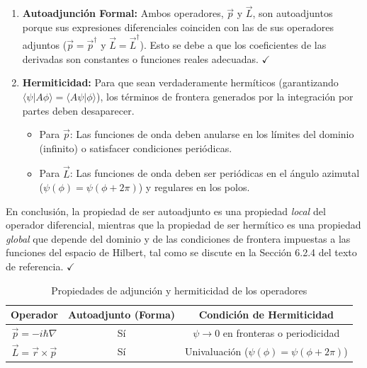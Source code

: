 \documentclass[a4paper]{article}
\begin{document}
\begin{enumerate}
    \item \textbf{Autoadjunción Formal:} Ambos operadores, $\vec{p}$ y $\vec{L}$, son autoadjuntos porque sus expresiones diferenciales coinciden con las de sus operadores adjuntos ($\vec{p} = \vec{p}^\dagger$ y $\vec{L} = \vec{L}^\dagger$). Esto se debe a que los coeficientes de las derivadas son constantes o funciones reales adecuadas. $\checkmark$
    
    \item \textbf{Hermiticidad:} Para que sean verdaderamente hermíticos (garantizando $\langle \psi | A \phi \rangle = \langle A \psi | \phi \rangle$), los términos de frontera generados por la integración por partes deben desaparecer.
    \begin{itemize}
        \item Para $\vec{p}$: Las funciones de onda deben anularse en los límites del dominio (infinito) o satisfacer condiciones periódicas.
        \item Para $\vec{L}$: Las funciones de onda deben ser periódicas en el ángulo azimutal ($\psi(\phi) = \psi(\phi+2\pi)$) y regulares en los polos.
    \end{itemize}
\end{enumerate}

En conclusión, la propiedad de ser autoadjunto es una propiedad \textit{local} del operador diferencial, mientras que la propiedad de ser hermítico es una propiedad \textit{global} que depende del dominio y de las condiciones de frontera impuestas a las funciones del espacio de Hilbert, tal como se discute en la Sección 6.2.4 del texto de referencia. $\checkmark$

\begin{table}[h]
\centering
\begin{tabular}{|c|c|c|}
\hline
\textbf{Operador} & \textbf{Autoadjunto (Forma)} & \textbf{Condición de Hermiticidad} \\
\hline
$\vec{p} = -i\hbar\nabla$ & Sí & $\psi \to 0$ en fronteras o periodicidad \\
\hline
$\vec{L} = \vec{r} \times \vec{p}$ & Sí & Univaluación ($\psi(\phi) = \psi(\phi+2\pi)$) \\
\hline
\end{tabular}
\caption{Propiedades de adjunción y hermiticidad de los operadores}
\end{table}
\end{document}
